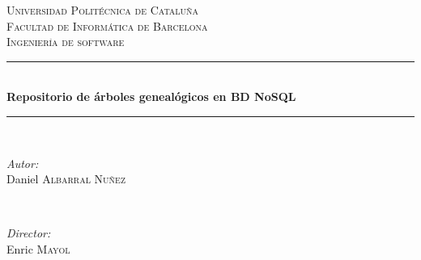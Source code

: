 \documentclass[12pt]{article} %
\begin{document}
\begin{titlepage}

\newcommand{\HRule}{\rule{\linewidth}{0.5mm}} %

\center %
 

\textsc{\LARGE Universidad Politécnica de Cataluña}\\[1.5cm] %
\textsc{\Large Facultad de Informática de Barcelona}\\[0.5cm] %
\textsc{\large Ingeniería de software}\\[0.5cm] %


\HRule \\[0.4cm]
{ \huge \bfseries Repositorio de árboles genealógicos en BD NoSQL}\\[0.4cm] %
\HRule \\[1.5cm]
 

\begin{minipage}{0.4\textwidth}
\begin{flushleft} \large
\emph{Autor:}\\
Daniel \textsc{Albarral Nuñez} %
\end{flushleft}
\end{minipage}
~
\begin{minipage}{0.4\textwidth}
\begin{flushright} \large
\emph{Director:} \\
Enric \textsc{Mayol} %
\end{flushright}
\end{minipage}\\[4cm]



\end{titlepage}
\end{document}
